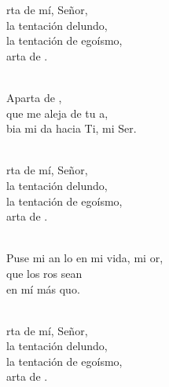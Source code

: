 \begin{cancion}%
	\begin{chorus}%
	rta de mí, Señor,\\
	la tentación delundo,\\
	la tentación de egoísmo, \\
	arta de .\\
	\end{chorus}%
	\jump\\
	Aparta de ,  \\
	que me aleja de tu a,\\
	bia mi da hacia Ti, mi Ser.\\\jump\\
	\begin{chorus}%
	rta de mí, Señor,\\
	la tentación delundo,\\
	la tentación de egoísmo, \\
	arta de .\\
	\end{chorus}%
	\jump\\
	Puse mi an lo en mi vida, mi or,  \\
	 que los ros sean \\
	en mí más quo.\\\jump\\
	\begin{chorus}%
	rta de mí, Señor,\\
	la tentación delundo,\\
	la tentación de egoísmo, \\
	arta de .\\
	\end{chorus}%
	\jump\\
\end{cancion}%
